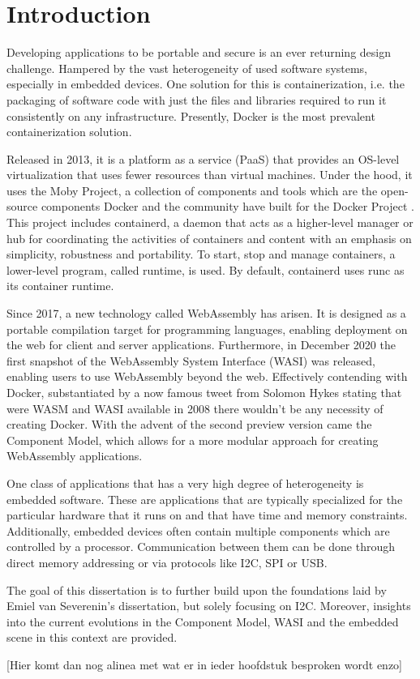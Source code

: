 \chapter{Introduction}
\label{chap:intro}

Developing applications to be portable and secure is an ever returning design challenge. Hampered by the vast heterogeneity of used software systems, especially in embedded devices.
One solution for this is containerization, i.e. the packaging of software code with just the files and libraries required to run it consistently on any infrastructure. Presently, Docker is the most prevalent containerization solution.

Released in 2013, it is a platform as a service (PaaS) that provides an OS-level virtualization that uses fewer resources than virtual machines. Under the hood, it uses the Moby Project, a collection of components and tools which are the open-source components Docker and the community have built for the Docker Project \cite{moby}. This project includes containerd, a daemon that acts as a higher-level manager or hub for coordinating the activities of containers and content with an emphasis on simplicity, robustness and portability. To start, stop and manage containers, a lower-level program, called runtime, is used. By default, containerd uses runc as its container runtime.

Since 2017, a new technology called WebAssembly has arisen. It is designed as a portable compilation target for programming languages, enabling deployment on the web for client and server applications. Furthermore, in December 2020 the first snapshot of the WebAssembly System Interface (WASI) was released, enabling users to use WebAssembly beyond the web.
Effectively contending with Docker, substantiated by a now famous tweet from Solomon Hykes stating that were WASM and WASI available in 2008 there wouldn't be any necessity of creating Docker.
With the advent of the second preview version came the Component Model, which allows for a more modular approach for creating WebAssembly applications.

One class of applications that has a very high degree of heterogeneity is embedded software. These are applications that are typically specialized for the particular hardware that it runs on and that have time and memory constraints. Additionally, embedded devices often contain multiple components which are controlled by a processor. Communication between them can be done through direct memory addressing or via protocols like I2C, SPI or USB.

The goal of this dissertation is to further build upon the foundations laid by Emiel van Severenin's dissertation, but solely focusing on I2C. Moreover, insights into the current evolutions in the Component Model, WASI and the embedded scene in this context are provided.

[Hier komt dan nog alinea met wat er in ieder hoofdstuk besproken wordt enzo]

